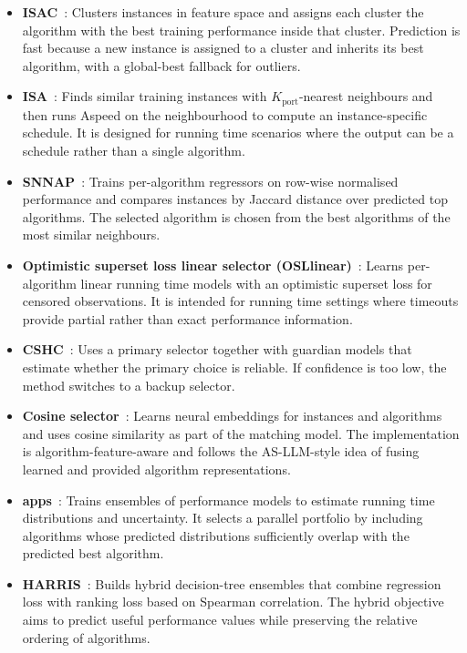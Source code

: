 \begin{itemize}
    \item \textbf{ISAC}~\citep{KadEtAl10}: Clusters instances in feature space and assigns each cluster the algorithm with the best training performance inside that cluster. Prediction is fast because a new instance is assigned to a cluster and inherits its best algorithm, with a global-best fallback for outliers.
    \item \textbf{ISA}~\citep{LinEtAl16}: Finds similar training instances with $K_{\mathrm{port}}$-nearest neighbours and then runs Aspeed on the neighbourhood to compute an instance-specific schedule. It is designed for running time scenarios where the output can be a schedule rather than a single algorithm.
    \item \textbf{SNNAP}~\citep{ColEtAl13}: Trains per-algorithm regressors on row-wise normalised performance and compares instances by Jaccard distance over predicted top algorithms. The selected algorithm is chosen from the best algorithms of the most similar neighbours.
    \item \textbf{Optimistic superset loss linear selector (OSLlinear)}~\citep{HanEtAl21b}: Learns per-algorithm linear running time models with an optimistic superset loss for censored observations. It is intended for running time settings where timeouts provide partial rather than exact performance information.
    \item \textbf{CSHC}~\citep{MalEtAl13}: Uses a primary selector together with guardian models that estimate whether the primary choice is reliable. If confidence is too low, the method switches to a backup selector.
    \item \textbf{Cosine selector}~\citep{WuEtAl24}: Learns neural embeddings for instances and algorithms and uses cosine similarity as part of the matching model. The implementation is algorithm-feature-aware and follows the AS-LLM-style idea of fusing learned and provided algorithm representations.
    \item \textbf{\Gls{apps}}~\citep{KasKot23}: Trains ensembles of performance models to estimate running time distributions and uncertainty. It selects a parallel portfolio by including algorithms whose predicted distributions sufficiently overlap with the predicted best algorithm.
    \item \textbf{HARRIS}~\citep{FehEtAl22}: Builds hybrid decision-tree ensembles that combine regression loss with ranking loss based on Spearman correlation. The hybrid objective aims to predict useful performance values while preserving the relative ordering of algorithms.

\end{itemize}
